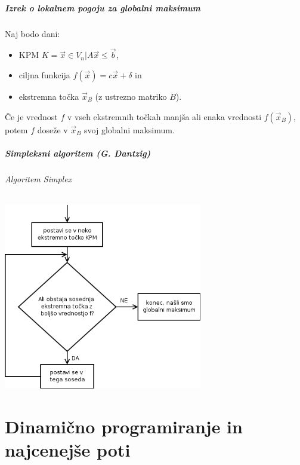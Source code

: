 \documentclass[a4paper,10pt]{article}
\begin{document}
\subsubsection{Izrek o lokalnem pogoju za globalni maksimum}

Naj bodo dani:
\begin{itemize}
\item KPM $K = {\vec x \in V_n | A \vec x \leq \vec b}$,
\item ciljna funkcija $f(\vec x) = c \vec x + \delta$ in
\item ekstremna to\v cka $\vec x_B$ (z ustrezno matriko $B$).
\end{itemize}
\v Ce je vrednost $f$ v vseh ekstremnih to\v ckah manj\v sa ali enaka vrednosti $f(\vec x_B)$, potem $f$ dose\v ze v $\vec x_B$ svoj globalni maksimum.

\subsubsection{Simpleksni algoritem (G. Dantzig)}

\paragraph{Algoritem Simplex}
	\begin{center}
	\includegraphics[width=8.7cm,height=8.15cm]{Slike/SimpleksniAlgoritem.png}
	\end{center}


\part{Dinami\v cno programiranje in najcenej\v se poti}
\end{document}
